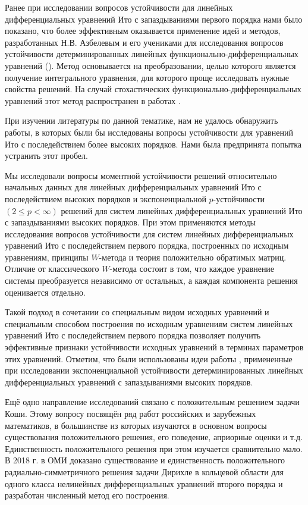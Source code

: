 Ранее при исследовании вопросов устойчивости для линейных дифференциальных уравнений Ито с запаздываниями первого порядка нами было показано, что 
более эффективным оказывается применение идей и методов, разработанных Н.В. Азбелевым и его учениками для исследования вопросов устойчивости детерминированных линейных функционально-дифференциальных уравнений (\cite{kri-bib-5, kri-bib-6, kri-bib-7, kri-bib-8}).
%
Метод основывается на преобразовании, целью которого является получение интегрального уравнения, для которого проще исследовать нужные свойства решений.
На случай стохастических функционально-дифференциальных уравнений этот метод распространен в работах \cite{kri-bib-9, kri-bib-10, kri-bib-11, kri-bib-12, kri-bib-13, kri-bib-14, kri-bib-15}.

При изучении литературы по данной тематике, нам не удалось обнаружить работы, в которых были бы исследованы вопросы устойчивости для уравнений Ито с последействием более высоких порядков.
Нами была предпринята попытка устранить этот пробел. 

Мы исследовали вопросы 
моментной устойчивости решений относительно начальных данных для линейных дифференциальных уравнений Ито с последействием высоких порядков
и
экспоненциальной $p$-устойчивости $(2 \le p < \infty)$ решений для систем линейных дифференциальных уравнений Ито с запаздываниями высоких порядков. 
При этом применяются методы исследования вопросов устойчивости для систем линейных дифференциальных уравнений Ито с последействием первого порядка, построенных по исходным уравнениям, принципы  $W$-метода и теория положительно обратимых матриц.
Отличие от классического $W$-метода состоит в том, что каждое уравнение системы преобразуется независимо от остальных, а каждая компонента решения оценивается отдельно.

Такой подход в сочетании со специальным видом исходных уравнений и специальным способом построения по исходным уравнениям систем линейных уравнений Ито с последействием первого порядка позволяет получить эффективные признаки устойчивости исходных уравнений в терминах параметров этих уравнений.
Отметим, что были использованы идеи работы \cite{kri-bib-16}, примененные при исследовании экспоненциальной устойчивости детерминированных линейных дифференциальных уравнений с запаздываниями высоких порядков.



Ещё одно направление исследований связано с положительным решением задачи Коши. Этому вопросу посвящён ряд
работ российских и зарубежных математиков, в большинстве из которых изучаются в основном
вопросы существования положительного решения, его поведение,
априорные оценки и т.д.
Единственность положительного решения при этом изучается сравнительно мало.
В 2018 г. в ОМИ доказано существование и единственность положительного радиально-симметричного решения задачи Дирихле в кольцевой
области для одного класса нелинейных дифференциальных уравнений второго порядка и разработан численный метод его построения.

